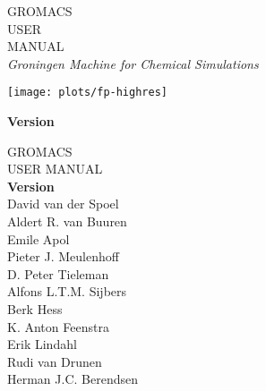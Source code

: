 \documentclass[11pt,a4paper,twoside]{gmxmanual}
\begin{document}

\addtolength{\oddsidemargin}{-5mm}

%
%
\pagestyle{empty}
\begin{center}

{
\fontsize{64}{70} \selectfont 
GROMACS\\
USER \\
MANUAL\\
}
\vspace{1cm}
{\Large \em Groningen Machine for Chemical Simulations}

\vspace{0.75cm}
\texttt{[image: plots/fp-highres]}

\vspace{0.25cm}
{\fontsize{30}{36} \selectfont \bf Version \gmxver}

\end{center}
\vfill

\cleardoublepage
\addtolength{\oddsidemargin}{5mm}

%
%
\renewcommand{\chaptermark}[1]{\markboth{#1}{#1}} %
\renewcommand{\sectionmark}[1]{\markright{\thesection\ #1}}
\lhead[\fancyplain{}{\em\thepage}]{\fancyplain{}{\em\rightmark}}
\rhead[\fancyplain{}{\em\leftmark}]{\fancyplain{}{\em\thepage}}
\cfoot{}


\begin{center}
\phantom{ }
\vspace{1cm}
{\fontsize{40}{50} \selectfont 
GROMACS\\
USER MANUAL\\[1cm]
}
{\LARGE\bf Version \gmxver}\\[1cm]
{\Large 
David van der Spoel     \\
Aldert R. van Buuren    \\
Emile Apol              \\
Pieter J. Meulenhoff    \\
D. Peter Tieleman       \\
Alfons L.T.M. Sijbers   \\
Berk Hess               \\
K. Anton Feenstra       \\
Erik Lindahl            \\
Rudi van Drunen         \\
Herman J.C. Berendsen \\
}
\end{center}
\end{document}
